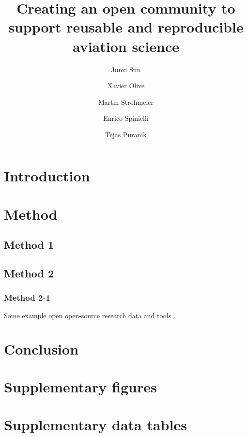 \documentclass[
  manuscript=Re/Science,  %
  year=20xx,
  volume=x,
]{joas}
\title{Creating an open community to support reusable and reproducible aviation science}
\author{Junzi Sun}
\affiliation{Joint first authors}
\author{Xavier Olive}
\affiliation{Joint first authors}
\author{Martin Strohmeier}
\affiliation{Joint first authors}
\author{Enrico Spinielli}
\affiliation{EUROCONTROL, Belgium}
\author{Tejas Puranik}
\affiliation{NASA Ames Research Center, USA}
\begin{document}
\begin{abstract}
  \blindtext
\end{abstract}

\section{Introduction}
\Blindtext

\section{Method}

\subsection{Method 1}
\blindtext

\subsection{Method 2}
\subsubsection{Method 2-1}
\blindtext

Some example open open-source research data \citep{schafer2014bringing} and tools \citep{olive2019traffic,sun2020openap}. 


\section{Conclusion}

\Blindtext


\begin{acknowledgement}
\blindtext
\end{acknowledgement}


\printbibliography

\appendix

\section{Supplementary figures}
\blindtext

\section{Supplementary data tables}
\blindtext
\end{document}
